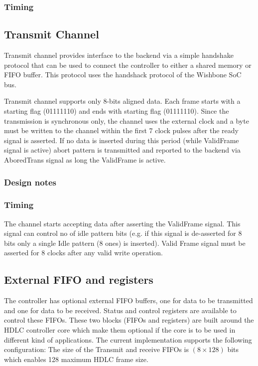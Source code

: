 \documentclass[a4paper,11pt]{article}
\begin{document}
\subsubsection{Timing}
 
 
\subsection{Transmit Channel}
Transmit channel provides interface to the backend via a simple handshake protocol that can be used to connect the controller to either a shared memory or FIFO buffer. This protocol uses the handshack protocol of the Wishbone SoC bus.
 
Transmit channel supports only 8-bits aligned data. Each frame starts with a starting flag (01111110) and ends with starting flag (01111110). Since the transmission is synchronous only, the channel uses the external clock and a byte must be written to the channel within the first 7 clock pulses after the ready signal is asserted. If no data is inserted during this period (while ValidFrame signal is active) abort pattern is transmitted and reported to the backend via AboredTrans signal as long the ValidFrame is active.
 
 
\subsubsection{Design notes}
 
\subsubsection{Timing}
The channel starts accepting data after asserting the ValidFrame signal. This signal can control no of idle pattern bits (e.g. if this signal is de-asserted for 8 bits only a single Idle pattern (8 ones) is inserted). Valid Frame signal must be asserted for 8 clocks after any valid write operation.
 
\subsection{External FIFO and registers}
The controller has optional external FIFO buffers, one for data to be transmitted and one for data to be received. Status and control registers are available to control these FIFOs. These two blocks (FIFOs and registers) are built around the HDLC controller core which make them optional if the core is to be used in different kind of applications.
The current implementation supports the following configuration: 
The size of the Transmit and receive FIFOs is $(8\times 128)$ bits which enables 128 maximum HDLC frame size.
 
\end{document}
